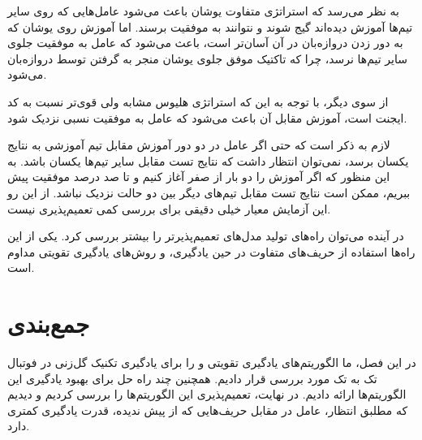 به نظر می‌رسد که استراتژی متفاوت یوشان باعث می‌شود عامل‌هایی که روی سایر تیم‌ها آموزش دیده‌اند گیج شوند و نتوانند به موفقیت برسند.
اما آموزش روی یوشان که به دور زدن دروازه‌بان در آن آسان‌تر است، باعث می‌شود که عامل 
به موفقیت جلوی سایر تیم‌ها نرسد، چرا که تاکتیک موفق جلوی یوشان منجر به گرفتن توسط دروازه‌بان می‌شود.

از سوی دیگر، با توجه به این که استراتژی هلیوس مشابه ولی قوی‌تر نسبت به کد ایجنت است، آموزش مقابل آن باعث می‌شود که عامل به موفقیت نسبی نزدیک شود.

لازم به ذکر است که حتی اگر عامل در دو دور آموزش مقابل تیم آموزشی به نتایج یکسان برسد، نمی‌توان انتظار داشت که نتایج تست مقابل سایر تیم‌ها یکسان باشد. به این منظور که اگر آموزش را دو بار از صفر آغاز کنیم و تا صد درصد موفقیت پیش ببریم، ممکن است نتایج تست مقابل تیم‌های دیگر بین دو حالت نزدیک نباشد. از این رو این آزمایش معیار خیلی دقیقی برای بررسی کمی تعمیم‌پذیری نیست.

در آینده می‌توان راه‌های تولید مدل‌های تعمیم‌پذیر‌تر را بیشتر بررسی کرد. یکی از این راه‌ها استفاده از حریف‌های متفاوت در حین یادگیری، و روش‌های یادگیری تقویتی مداوم است.

\section{جمع‌بندی}
در این فصل، ما الگوریتم‌های یادگیری تقویتی  و  را برای یادگیری تکنیک گل‌زنی در فوتبال تک به تک مورد بررسی قرار دادیم.
همچنین چند راه حل برای بهبود یادگیری این الگوریتم‌ها ارائه دادیم.
در نهایت، تعمیم‌پذیری این الگوریتم‌ها را بررسی کردیم و دیدیم که مطلبق انتظار، عامل در مقابل حریف‌هایی که از پیش ندیده، قدرت یادگیری کمتری دارد.
